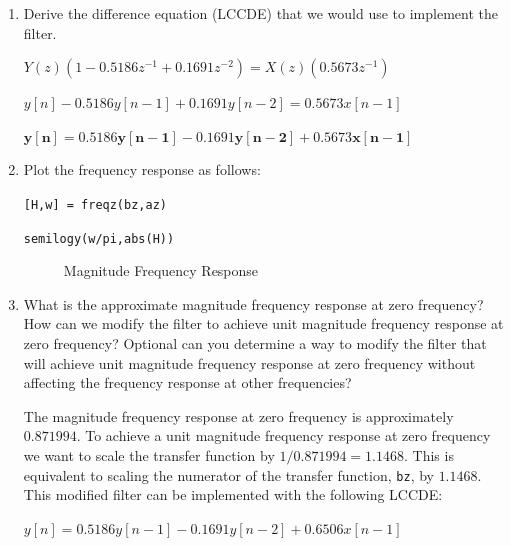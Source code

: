 \documentclass[fleqn]{article}
\begin{document}
\begin{enumerate}[nolistsep]
\begin{enumerate}[nolistsep]
			\item Derive the difference equation (LCCDE) that we would use to implement the filter.
			
				$Y(z)(1 - 0.5186z^{-1} + 0.1691z^{-2}) = X(z)(0.5673z^{-1})$
				
				$y[n] - 0.5186y[n-1] + 0.1691y[n-2] = 0.5673x[n-1]$
				
				$\mathbf{y[n] = 0.5186y[n-1] - 0.1691y[n-2] + 0.5673x[n-1]}$
				
			\item Plot the frequency response as follows:
			
				\texttt{[H,w] = freqz(bz,az)}
				
				\texttt{semilogy(w/pi,abs(H))}
				
				\begin{figure}[H]
					\centerline{}
					\caption{Magnitude Frequency Response}
				\end{figure}
				
			\item What is the approximate magnitude frequency response at zero frequency? How can we modify the filter to achieve unit magnitude frequency response at zero frequency? Optional can you determine a way to modify the filter that will achieve unit magnitude frequency response at zero frequency without affecting the frequency response at other frequencies?
			
				The magnitude frequency response at zero frequency is approximately $0.871994$. To achieve a unit magnitude frequency response at zero frequency we want to scale the transfer function by $1/0.871994 = 1.1468$. This is equivalent to scaling the numerator of the transfer function, \texttt{bz}, by $1.1468$. This modified filter can be implemented with the following LCCDE:
				
				$y[n] = 0.5186y[n-1] - 0.1691y[n-2] + 0.6506x[n-1]$
		\end{enumerate}
		

\end{enumerate}
\end{document}
